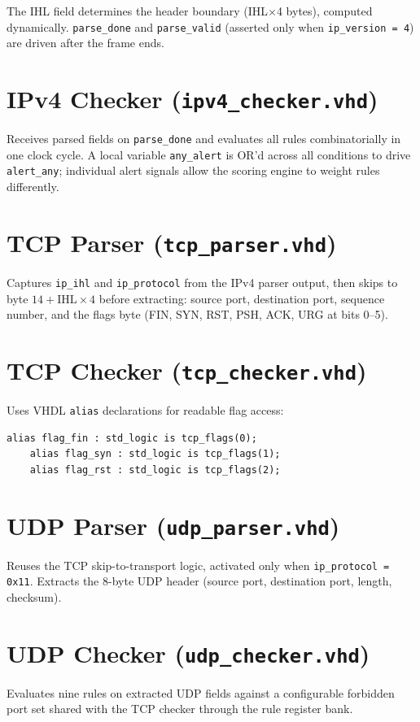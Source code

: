 The IHL field determines the header boundary (IHL$\times$4 bytes), computed dynamically. \texttt{parse\_done} and \texttt{parse\_valid} (asserted only when \texttt{ip\_version = 4}) are driven after the frame ends.

\section{IPv4 Checker (\texttt{ipv4\_checker.vhd})}
Receives parsed fields on \texttt{parse\_done} and evaluates all rules combinatorially in one clock cycle. A local variable \texttt{any\_alert} is OR'd across all conditions to drive \texttt{alert\_any}; individual alert signals allow the scoring engine to weight rules differently.

\section{TCP Parser (\texttt{tcp\_parser.vhd})}
Captures \texttt{ip\_ihl} and \texttt{ip\_protocol} from the IPv4 parser output, then skips to byte $14 + \text{IHL}\times4$ before extracting: source port, destination port, sequence number, and the flags byte (FIN, SYN, RST, PSH, ACK, URG at bits 0--5).

\section{TCP Checker (\texttt{tcp\_checker.vhd})}
Uses VHDL \texttt{alias} declarations for readable flag access:
\begin{lstlisting}[caption={Flag aliases in \texttt{tcp\_checker.vhd}}]
	alias flag_fin : std_logic is tcp_flags(0);
	alias flag_syn : std_logic is tcp_flags(1);
	alias flag_rst : std_logic is tcp_flags(2);
\end{lstlisting}

\section{UDP Parser (\texttt{udp\_parser.vhd})}
Reuses the TCP skip-to-transport logic, activated only when \texttt{ip\_protocol = 0x11}. Extracts the 8-byte UDP header (source port, destination port, length, checksum).

\section{UDP Checker (\texttt{udp\_checker.vhd})}
Evaluates nine rules on extracted UDP fields against a configurable forbidden port set shared with the TCP checker through the rule register bank.

